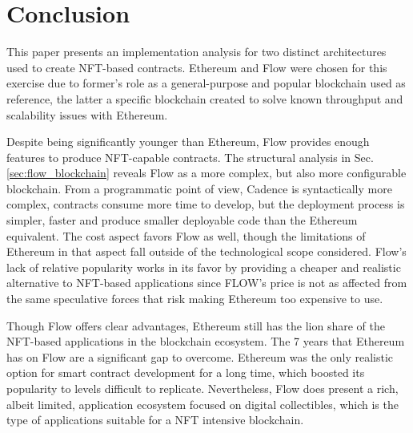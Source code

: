\documentclass[../NFTComp_IEEE.tex]{subfiles}
\begin{document}
\section{Conclusion}
\label{sec:conclusion}
This paper presents an implementation analysis for two distinct architectures used to create NFT-based contracts. Ethereum and Flow were chosen for this exercise due to former's role as a general-purpose and popular blockchain used as reference, the latter a specific blockchain created to solve known throughput and scalability issues with Ethereum.
\par
Despite being significantly younger than Ethereum, Flow provides enough features to produce NFT-capable contracts. The structural analysis in Sec. \ref{sec:flow_blockchain} reveals Flow as a more complex, but also more configurable blockchain. From a programmatic point of view, Cadence is syntactically more complex, contracts consume more time to develop, but the deployment process is simpler, faster and produce smaller deployable code than the Ethereum equivalent. The cost aspect favors Flow as well, though the limitations of Ethereum in that aspect fall outside of the technological scope considered. Flow's lack of relative popularity works in its favor by providing a cheaper and realistic alternative to NFT-based applications since FLOW's price is not as affected from the same speculative forces that risk making Ethereum too expensive to use.
\par
Though Flow offers clear advantages, Ethereum still has the lion share of the NFT-based applications in the blockchain ecosystem. The 7 years that Ethereum has on Flow are a significant gap to overcome. Ethereum was the only realistic option for smart contract development for a long time, which boosted its popularity to levels difficult to replicate. Nevertheless, Flow does present a rich, albeit limited, application ecosystem focused on digital collectibles, which is the type of applications suitable for a NFT intensive blockchain.
\end{document}
